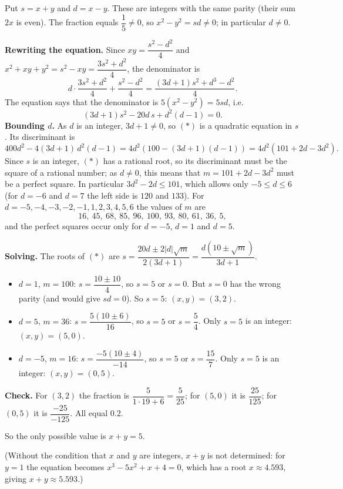 Put $s=x+y$ and $d=x-y$. These are integers with the same parity (their sum $2x$ is even). The fraction equals $\dfrac15\ne0$, so $x^2-y^2=sd\ne0$; in particular $d\ne0$.

\textbf{Rewriting the equation.} Since $xy=\dfrac{s^2-d^2}{4}$ and $x^2+xy+y^2=s^2-xy=\dfrac{3s^2+d^2}{4}$, the denominator is
\[d\cdot\dfrac{3s^2+d^2}{4}+\dfrac{s^2-d^2}{4}=\dfrac{(3d+1)s^2+d^3-d^2}{4}.\]
The equation says that the denominator is $5\left(x^2-y^2\right)=5sd$, i.e.
\[(3d+1)s^2-20d\,s+d^2(d-1)=0.\tag{$*$}\]
\textbf{Bounding $d$.} As $d$ is an integer, $3d+1\ne0$, so $(*)$ is a quadratic equation in $s$. Its discriminant is
\[400d^2-4(3d+1)\,d^2(d-1)=4d^2\left(100-(3d+1)(d-1)\right)=4d^2\left(101+2d-3d^2\right).\]
Since $s$ is an integer, $(*)$ has a rational root, so its discriminant must be the square of a rational number; as $d\ne0$, this means that $m=101+2d-3d^2$ must be a perfect square. In particular $3d^2-2d\le101$, which allows only $-5\le d\le6$ (for $d=-6$ and $d=7$ the left side is $120$ and $133$). For $d=-5,-4,-3,-2,-1,1,2,3,4,5,6$ the values of $m$ are
\[16,\ 45,\ 68,\ 85,\ 96,\ 100,\ 93,\ 80,\ 61,\ 36,\ 5,\]
and the perfect squares occur only for $d=-5$, $d=1$ and $d=5$.

\textbf{Solving.} The roots of $(*)$ are $s=\dfrac{20d\pm2|d|\sqrt m}{2(3d+1)}=\dfrac{d\left(10\pm\sqrt m\right)}{3d+1}$.
\begin{itemize}
\item $d=1$, $m=100$: $s=\dfrac{10\pm10}{4}$, so $s=5$ or $s=0$. But $s=0$ has the wrong parity (and would give $sd=0$). So $s=5$: $(x,y)=(3,2)$.
\item $d=5$, $m=36$: $s=\dfrac{5(10\pm6)}{16}$, so $s=5$ or $s=\dfrac54$. Only $s=5$ is an integer: $(x,y)=(5,0)$.
\item $d=-5$, $m=16$: $s=\dfrac{-5(10\pm4)}{-14}$, so $s=5$ or $s=\dfrac{15}{7}$. Only $s=5$ is an integer: $(x,y)=(0,5)$.
\end{itemize}
\textbf{Check.} For $(3,2)$ the fraction is $\dfrac{5}{1\cdot19+6}=\dfrac5{25}$; for $(5,0)$ it is $\dfrac{25}{125}$; for $(0,5)$ it is $\dfrac{-25}{-125}$. All equal $0.2$.

So the only possible value is $x+y=\boxed{5}$.

(Without the condition that $x$ and $y$ are integers, $x+y$ is not determined: for $y=1$ the equation becomes $x^3-5x^2+x+4=0$, which has a root $x\approx4.593$, giving $x+y\approx5.593$.)
